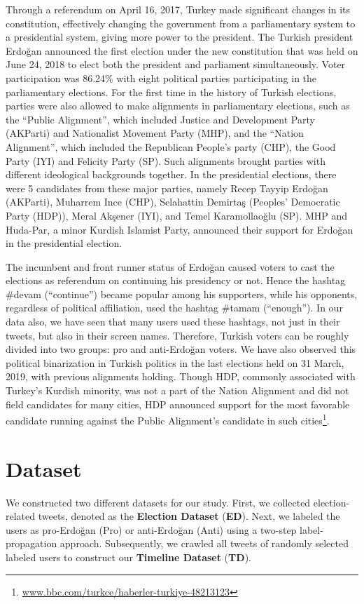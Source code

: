 \documentclass[letterpaper]{article} \usepackage{aaai20}  \usepackage{times}  \usepackage{stackengine}
\begin{document}
Through a referendum on April 16, 2017, Turkey made significant changes in its constitution, effectively changing the government from a parliamentary system to a presidential system, giving more power to the president. The Turkish president Erdo\u{g}an announced the first election under the new constitution that was held on June 24, 2018 to elect both the president and parliament simultaneously. Voter participation was 86.24\% with eight political parties participating in the parliamentary elections. For the first time in the history of Turkish elections, parties were also allowed to make alignments in parliamentary elections, such as the ``Public Alignment'', which included Justice and Development Party (AKParti) and Nationalist Movement Party (MHP), and the ``Nation Alignment'', which included the Republican People's party (CHP), the Good Party (IYI) and Felicity Party (SP). Such alignments brought parties with different ideological backgrounds together. In the presidential elections, there were 5 candidates from these major parties, namely Recep Tayyip Erdo\u{g}an (AKParti), Muharrem Ince (CHP), Selahattin Demirta\c{s} (Peoples' Democratic Party (HDP)), Meral Ak\c{s}ener (IYI), and Temel Karamollao\u{g}lu (SP). MHP and Huda-Par, a minor Kurdish Islamist Party, announced their support for Erdo\u{g}an in the presidential election.

The incumbent and front runner status of Erdo\u{g}an caused voters to cast the elections as referendum on continuing his presidency or not. Hence the hashtag \#devam (``continue'') became popular among his supporters, while his opponents, regardless of political affiliation, used the hashtag \#tamam (``enough''). In our data also, we have seen that many users used these hashtags, not just in their tweets, but also in their screen names. Therefore, Turkish voters can be roughly divided into two groups: pro and anti-Erdo\u{g}an voters.  We have also observed this political binarization in Turkish politics in the last elections held on 31 March, 2019, with previous alignments holding. Though HDP, commonly associated with Turkey's Kurdish minority, was not a part of the Nation Alignment and did not field candidates for many cities, HDP announced support for the most favorable candidate running against the Public Alignment's candidate in such cities\footnote{\url{www.bbc.com/turkce/haberler-turkiye-48213123}}.    






\section{Dataset}
We constructed two different datasets for our study. First, we collected election-related tweets, denoted as the \textbf{Election Dataset} (\textbf{ED}). Next, we labeled the users as pro-Erdo\u{g}an (Pro) or anti-Erdo\u{g}an (Anti) using a two-step label-propagation approach. 
Subsequently, we crawled all tweets of randomly selected labeled users to construct our \textbf{Timeline Dataset} (\textbf{TD}).
\end{document}
